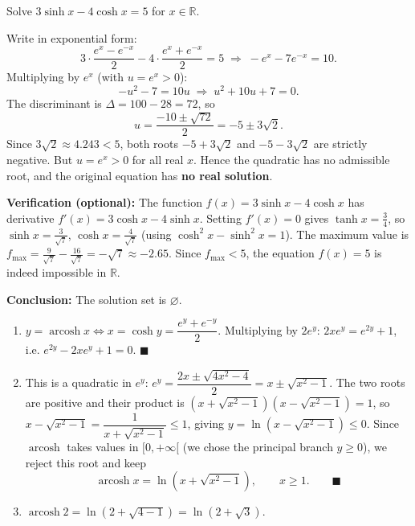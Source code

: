 \documentclass[11pt]{article}
\begin{document}
\begin{corrige}
Solve $3\sinh x - 4\cosh x = 5$ for $x \in \mathbb{R}$.

Write in exponential form:
\[ 3\cdot\frac{e^x - e^{-x}}{2} - 4\cdot\frac{e^x + e^{-x}}{2} = 5 \;\Longrightarrow\; -e^x - 7e^{-x} = 10. \]
Multiplying by $e^x$ (with $u = e^x > 0$):
\[ -u^2 - 7 = 10u \;\Longrightarrow\; u^2 + 10u + 7 = 0. \]
The discriminant is $\Delta = 100 - 28 = 72$, so
\[ u = \frac{-10 \pm \sqrt{72}}{2} = -5 \pm 3\sqrt{2}. \]
Since $3\sqrt{2} \approx 4.243 < 5$, both roots $-5 + 3\sqrt{2}$ and $-5 - 3\sqrt{2}$ are strictly negative. But $u = e^x > 0$ for all real $x$. Hence the quadratic has no admissible root, and the original equation has \textbf{no real solution}.

\textbf{Verification (optional):} The function $f(x) = 3\sinh x - 4\cosh x$ has derivative $f'(x) = 3\cosh x - 4\sinh x$. Setting $f'(x)=0$ gives $\tanh x = \frac{3}{4}$, so $\sinh x = \frac{3}{\sqrt{7}}$, $\cosh x = \frac{4}{\sqrt{7}}$ (using $\cosh^2 x - \sinh^2 x = 1$). The maximum value is $f_{\max} = \frac{9}{\sqrt{7}} - \frac{16}{\sqrt{7}} = -\sqrt{7} \approx -2.65$. Since $f_{\max} < 5$, the equation $f(x)=5$ is indeed impossible in $\mathbb{R}$.

\textbf{Conclusion:} The solution set is $\varnothing$.
\end{corrige}

\begin{corrige}
\begin{enumerate}
\item $y = \operatorname{arcosh} x \iff x = \cosh y = \dfrac{e^y + e^{-y}}{2}$. Multiplying by $2e^y$: $2xe^y = e^{2y} + 1$, i.e. $e^{2y} - 2xe^y + 1 = 0$. $\blacksquare$
\item This is a quadratic in $e^y$: $e^y = \dfrac{2x \pm \sqrt{4x^2 - 4}}{2} = x \pm \sqrt{x^2 - 1}$. The two roots are positive and their product is $(x + \sqrt{x^2-1})(x - \sqrt{x^2-1}) = 1$, so $x - \sqrt{x^2 - 1} = \dfrac{1}{x + \sqrt{x^2-1}} \leq 1$, giving $y = \ln(x - \sqrt{x^2-1}) \leq 0$. Since $\operatorname{arcosh}$ takes values in $[0, +\infty[$ (we chose the principal branch $y \geq 0$), we reject this root and keep
\[ \operatorname{arcosh} x = \ln\!\left(x + \sqrt{x^2 - 1}\right), \qquad x \geq 1. \qquad \blacksquare \]
\item $\operatorname{arcosh} 2 = \ln\!\left(2 + \sqrt{4 - 1}\right) = \ln(2 + \sqrt{3})$.
\end{enumerate}
\end{corrige}
\end{document}
